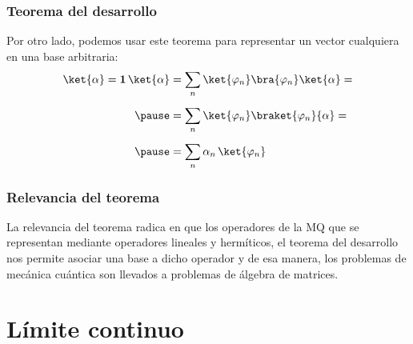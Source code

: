 \begin{frame}
\frametitle{Teorema del desarrollo}
 Por otro lado, podemos usar este teorema para representar un vector cualquiera en una base arbitraria:
\begin{eqnarray}
\begin{aligned}[b]
\ket{\alpha} = \mathbf{1} \, \ket{\alpha} &= \sum_{n} \ket{\varphi_{n}} \bra{\varphi_{n}} \ket{\alpha} = \\[0.5em] \pause
&= \sum_{n} \ket{\varphi_{n}} \braket{\varphi_{n}}{\alpha} = \\[0.5em] \pause
&= \sum_{n} \alpha_{n} \, \ket{\varphi_{n}}
\end{aligned}
\label{eq:ecuacion_13}
\end{eqnarray}
\end{frame}
\begin{frame}
\frametitle{Relevancia del teorema}
La relevancia del teorema radica en que los operadores de la MQ que se representan mediante operadores lineales y hermíticos, el teorema del desarrollo nos permite asociar una base a dicho operador y de esa manera, los problemas de mecánica cuántica son llevados a problemas de álgebra de matrices.
\end{frame}
\section{Límite continuo}
